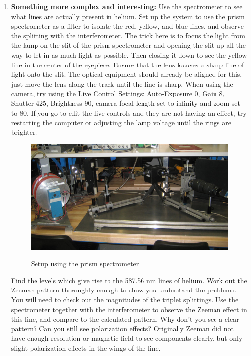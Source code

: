 \documentclass{../lab}
\begin{document}
\begin{enumerate}
    \item \textbf{Something more complex and interesting:} Use the spectrometer to see what lines are actually present in helium. Set up the system to use the prism spectrometer as a filter to isolate the red, yellow, and blue lines, and observe the splitting with the interferometer. The trick here is to focus the light from the lamp on the slit of the prism spectrometer and opening the slit up all the way to let in as much light as possible. Then closing it down to see the yellow line in the center of the eyepiece. Ensure that the lens focuses a sharp line of light onto the slit. The optical equipment should already be aligned for this, just move the lens along the track until the line is sharp. When using the camera, try using the Live Control Settings: Auto-Exposure 0, Gain 8, Shutter 425, Brightness 90, camera focal length set to infinity and zoom set to 80. If you go to edit the live controls and they are not having an effect, try restarting the computer or adjusting the lamp voltage until the rings are brighter.
    \begin{figure}
    \centering
        \href{http://experimentationlab.berkeley.edu/sites/default/files/images/ATM_Zeeman_3489-Crop-Lg.jpg}{\includegraphics[width=0.8\linewidth]{images/ATM_Zeeman_3489-Crop-Lg.jpg}} \\
        \caption{Setup using the prism spectrometer}
        \label{PrismSpectrometer}
    \end{figure}
    
    Find the levels which give rise to the 587.56 nm lines of helium. Work out the Zeeman pattern thoroughly enough to show you understand the problems. You will need to check out the magnitudes of the triplet splittings. Use the spectrometer together with the interferometer to observe the Zeeman effect in this line, and compare to the calculated pattern. Why don't you see a clear pattern? Can you still see polarization effects? Originally Zeeman did not have enough resolution or magnetic field to see components clearly, but only slight polarization effects in the wings of the line.

\end{enumerate}
\end{document}
